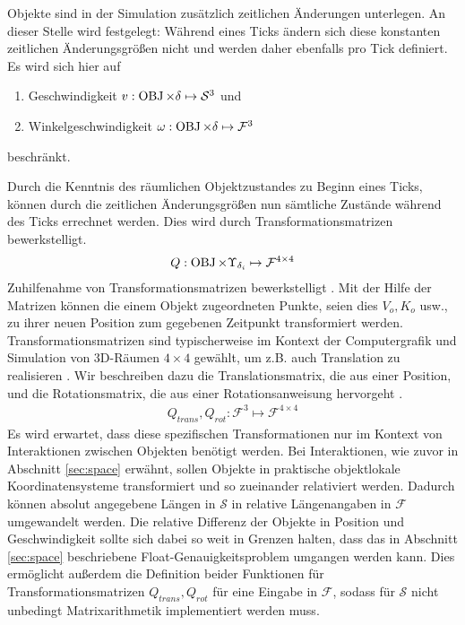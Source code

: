 Objekte sind in der Simulation zusätzlich zeitlichen Änderungen unterlegen.
An dieser Stelle wird festgelegt: Während eines Ticks ändern sich diese konstanten zeitlichen Änderungsgrößen nicht und werden daher ebenfalls pro Tick definiert.\\
 Es wird sich hier auf
\begin{enumerate}
\item Geschwindigkeit $v: \operatorname{OBJ} \times \delta \mapsto \mathcal{S}^3$  und
\item Winkelgeschwindigkeit $\omega : \operatorname{OBJ} \times \delta \mapsto \mathcal{F}^3 $
\end{enumerate}
beschränkt.

Durch die Kenntnis des räumlichen Objektzustandes zu Beginn eines Ticks, können durch die zeitlichen Änderungsgrößen nun sämtliche Zustände während des Ticks errechnet werden.
Dies wird durch Transformationsmatrizen bewerkstelligt.
\begin{align}
	Q: \operatorname{OBJ} \times \Upsilon_{\delta_i} \mapsto \mathcal{F}^{4\times 4}
\end{align}
 Zuhilfenahme von Transformationsmatrizen bewerkstelligt \cite[ch.4, p.67]{fourcrossfour}. Mit der Hilfe der Matrizen können die einem Objekt zugeordneten Punkte, seien dies $V_o, K_o$ usw., zu ihrer neuen Position zum gegebenen Zeitpunkt transformiert werden. Transformationsmatrizen sind typischerweise im Kontext der Computergrafik und Simulation von 3D-Räumen $4\times 4$ gewählt, um z.B. auch Translation zu realisieren \cite[ch. 4.4.1, p.76]{fourcrossfour}. Wir beschreiben dazu die 
Translationsmatrix, die aus einer Position,
und die Rotationsmatrix, die aus einer Rotationsanweisung hervorgeht \cite[ch.4.3, p.71]{fourcrossfour}.
\begin{align}
Q_{trans}, Q_{rot}:\mathcal{F}^3 \mapsto \mathcal{F}^{4\times 4}
\end{align}
Es wird erwartet, dass diese spezifischen Transformationen nur im Kontext von Interaktionen zwischen Objekten benötigt werden. Bei Interaktionen, wie zuvor in Abschnitt \ref{sec:space} erwähnt, sollen Objekte in praktische objektlokale Koordinatensysteme transformiert und so zueinander relativiert werden. Dadurch können absolut angegebene Längen in $\mathcal{S}$ in relative Längenangaben in $\mathcal{F}$ umgewandelt werden. Die relative Differenz der Objekte in Position und Geschwindigkeit sollte sich dabei so weit in Grenzen halten, dass das in Abschnitt \ref{sec:space} beschriebene Float-Genauigkeitsproblem umgangen werden kann.
Dies ermöglicht außerdem die Definition beider Funktionen für Transformationsmatrizen $Q_{trans}, Q_{rot}$ für eine Eingabe in $\mathcal{F}$, sodass für $\mathcal{S}$ nicht unbedingt Matrixarithmetik implementiert werden muss.

